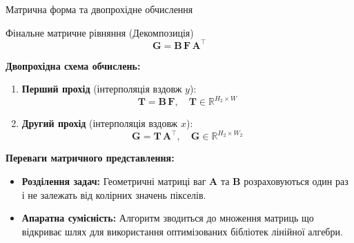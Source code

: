 \documentclass[11pt, aspectratio=169]{beamer}
\begin{document}
\begin{frame}{Матрична форма та двопрохідне обчислення}
	\begin{block}{Фінальне матричне рівняння (Декомпозиція)}
		\vspace{-0.1cm}
		\begin{equation*}
			\mathbf{G} = \mathbf{B}\, \mathbf{F}\, \mathbf{A}^{\top}
		\end{equation*}
	\end{block}
	
	\vspace{0.2cm}
	\textbf{Двопрохідна схема обчислень:}
	\begin{enumerate}
		\item \textbf{Перший прохід} (інтерполяція вздовж $y$): 
		\begin{equation*}
			\mathbf{T} = \mathbf{B}\, \mathbf{F}, \quad \mathbf{T} \in \mathbb{R}^{H_2 \times W}
		\end{equation*}
		\item \textbf{Другий прохід} (інтерполяція вздовж $x$): 
		\begin{equation*}
			\mathbf{G} = \mathbf{T}\, \mathbf{A}^{\top}, \quad \mathbf{G} \in \mathbb{R}^{H_2 \times W_2}
		\end{equation*}
	\end{enumerate}
	
	\vspace{0.1cm}
	\textbf{Переваги матричного представлення:}
	\begin{itemize}
		\item \textbf{Розділення задач:} Геометричні матриці ваг $\mathbf{A}$ та $\mathbf{B}$ розраховуються один раз і не залежать від колірних значень пікселів.
		\item \textbf{Апаратна сумісність:} Алгоритм зводиться до множення матриць що відкриває шлях для використання оптимізованих бібліотек лінійної алгебри.
	\end{itemize}
\end{frame}
	
\end{document}
